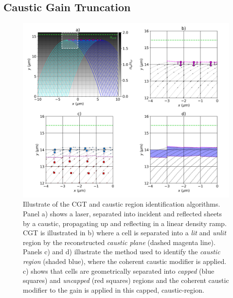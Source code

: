 \subsection{Caustic Gain Truncation}%
\label{sec:SOLAS_caustic_gain_truncation}

\begin{figure}[t!]
    \includegraphics[width=1.0\linewidth]{Numerics/Images/caustic_region_diagram.png}
    \centering
    \caption{Illustrate of the \ac{CGT} and caustic region identification algorithms.
    Panel a) shows a laser, separated into incident and reflected sheets by a caustic, propagating up and reflecting in a linear density ramp.
    \ac{CGT} is illustrated in b) where a cell is separated into a \textit{lit} and \textit{unlit} region by the reconstructed \textit{caustic plane} (dashed magenta line).
    Panels c) and d) illustrate the method used to identify the \textit{caustic region} (shaded blue), where the coherent caustic modifier is applied.
    c) shows that cells are geometrically separated into \textit{capped} (blue squares) and \textit{uncapped} (red squares) regions and the coherent caustic modifier to the gain is applied in this capped, caustic-region.}%
    \label{fig:SOLAS_caustic_region}
\end{figure}

